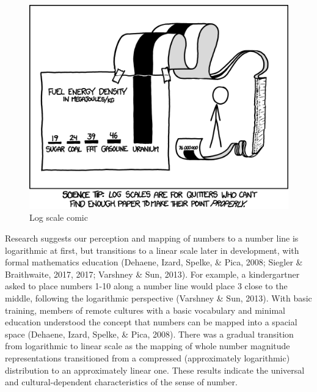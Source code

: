 \documentclass[print]{nuthesis}
\begin{document}
\begin{figure}[tbp]

{\centering \includegraphics[width=0.7\linewidth,]{images/log-scale-comic} 

}

\caption{Log scale comic}\label{fig:log-scale-comic}
\end{figure}


Research suggests our perception and mapping of numbers to a number line is logarithmic at first, but transitions
to a linear scale later in development, with formal mathematics education (Dehaene, Izard, Spelke, \& Pica, 2008; Siegler \& Braithwaite, 2017, 2017; Varshney \& Sun, 2013).
For example, a kindergartner asked to place numbers 1-10 along a number line would place 3 close to the middle, following the logarithmic perspective (Varshney \& Sun, 2013). 
With basic training, members of remote cultures with a basic vocabulary and minimal education understood the concept that numbers can be mapped into a spacial space (Dehaene, Izard, Spelke, \& Pica, 2008). There was a gradual transition from logarithmic to linear scale as the mapping of whole number magnitude representations transitioned from a compressed (approximately logarithmic) distribution to an approximately linear one.
These results indicate the universal and cultural-dependent characteristics of the sense of number.

\end{document}
